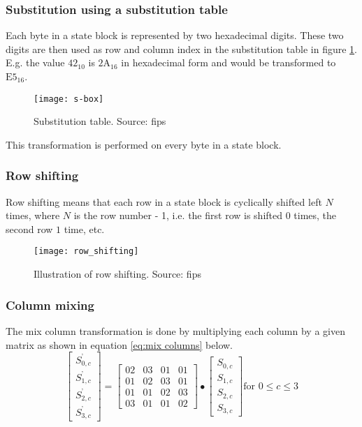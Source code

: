 \documentclass[report.tex]{subfiles}
\begin{document}
\subsubsection{Substitution using a substitution table}\label{sec:substitution}
Each byte in a state block is represented by two hexadecimal digits. These two digits are then used as row and column index in the substitution table in figure \ref{fig:s-box}. E.g. the value $\textrm{42}_{10}$ is $\textrm{2A}_{16}$ in hexadecimal form and would be transformed to $\textrm{E5}_{16}$.

\begin{figure}[h]
\centering
\texttt{[image: s-box]}
\caption{Substitution table. Source: fips}
\label{fig:s-box}
\end{figure}

This transformation is performed on every byte in a state block.

\subsubsection{Row shifting}
Row shifting means that each row in a state block is cyclically shifted left $N$ times, where $N$ is the row number - 1, i.e. the first row is shifted $0$ times, the second row $1$ time, etc.

\begin{figure}[h]
\centering
\texttt{[image: row\_shifting]}
\caption{Illustration of row shifting. Source: fips}
\label{fig:row_shifting}
\end{figure}

\subsubsection{Column mixing}
The mix column transformation is done by multiplying each column by a given matrix as shown in equation \ref{eq:mix columns} below.
\begin{equation}\label{eq:mix columns}
	\begin{bmatrix}
	S_{0,c}^\text{'} \\
	S_{1,c}^\text{'} \\
	S_{2,c}^\text{'} \\
	S_{3,c}^\text{'}
	\end{bmatrix}
	=
	\begin{bmatrix}
	02 & 03 & 01 & 01 \\
	01 & 02 & 03 & 01 \\
	01 & 01 & 02 & 03 \\
	03 & 01 & 01 & 02
	\end{bmatrix}
	\bullet
	\begin{bmatrix}
	S_{0,c} \\
	S_{1,c} \\
	S_{2,c} \\
	S_{3,c}
	\end{bmatrix}
	\text{for }0 \leq c \leq 3
\end{equation}
\end{document}
